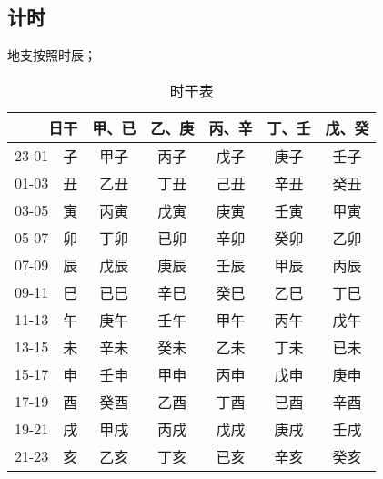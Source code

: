 \subsection{计时}
地支按照时辰；
\begin{table}[H]
  \centering
  \caption[]{时干表\footnotemark}
  \begin{tabular}{|c|c|c|c|c|c|c|}
    \hline \multicolumn{2}{|r|}{日干} & 甲、已 & 乙、庚 & 丙、辛 & 丁、壬 & 戊、癸 \\
    \hline 23-01 & 子 & 甲子 & 丙子 & 戊子 & 庚子 & 壬子 \\
    \hline 01-03 & 丑 & 乙丑 & 丁丑 & 己丑 & 辛丑 & 癸丑 \\
    \hline 03-05 & 寅 & 丙寅 & 戊寅 & 庚寅 & 壬寅 & 甲寅 \\
    \hline 05-07 & 卯 & 丁卯 & 已卯 & 辛卯 & 癸卯 & 乙卯 \\
    \hline 07-09 & 辰 & 戊辰 & 庚辰 & 壬辰 & 甲辰 & 丙辰 \\
    \hline 09-11 & 巳 & 已巳 & 辛巳 & 癸巳 & 乙巳 & 丁巳 \\
    \hline 11-13 & 午 & 庚午 & 壬午 & 甲午 & 丙午 & 戊午 \\
    \hline 13-15 & 未 & 辛未 & 癸未 & 乙未 & 丁未 & 已未 \\
    \hline 15-17 & 申 & 壬申 & 甲申 & 丙申 & 戊申 & 庚申 \\
    \hline 17-19 & 酉 & 癸酉 & 乙酉 & 丁酉 & 已酉 & 辛酉 \\
    \hline 19-21 & 戌 & 甲戌 & 丙戌 & 戊戌 & 庚戌 & 壬戌 \\
    \hline 21-23 & 亥 & 乙亥 & 丁亥 & 已亥 & 辛亥 & 癸亥 \\
    \hline
  \end{tabular}
\end{table}
